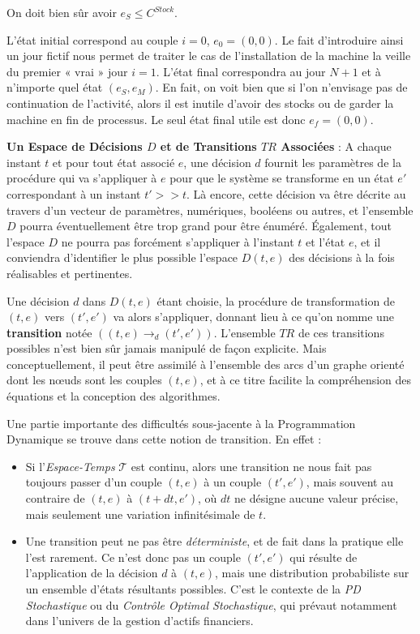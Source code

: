 On doit bien sûr avoir $e_S \leq C^{Stock}$.

L'état initial correspond au couple $i = 0$, $e_0 = (0, 0)$. Le fait d'introduire ainsi un jour fictif nous permet de traiter le cas de l'installation de la machine la veille du premier « vrai » jour $i = 1$.
L'état final correspondra au jour $N+1$ et à n'importe quel état $(e_S, e_M)$. En fait, on voit bien que si l'on n'envisage pas de continuation de l'activité, alors il est inutile d'avoir des stocks ou de garder la machine en fin de processus. Le seul état final utile est donc $e_f = (0, 0)$.

\textbf{Un Espace de Décisions $D$ et de Transitions $TR$ Associées} : A chaque instant $t$ et pour tout état associé $e$, une décision $d$ fournit les paramètres de la procédure qui va s'appliquer à $e$ pour que le système se transforme en un état $e'$ correspondant à un instant  $t' >> t$.  Là encore, cette décision va être décrite au travers d'un vecteur de paramètres, numériques, booléens ou autres, et l'ensemble $D$ pourra éventuellement être trop grand pour être énuméré. Également, tout l'espace $D $ ne pourra pas forcément s'appliquer à l'instant $t$ et l'état $e$, et il conviendra d'identifier le plus possible l'espace $D(t, e)$ des décisions à la fois réalisables et pertinentes. 

Une décision $d$ dans $D(t, e)$ étant choisie, la procédure de transformation de $(t, e)$ vers $(t', e')$ va alors s'appliquer, donnant lieu à ce qu'on nomme une \textbf{transition} notée $((t, e) \rightarrow_d (t', e'))$. L'ensemble $TR$ de ces transitions possibles n'est bien sûr jamais manipulé de façon explicite. Mais conceptuellement, il peut être assimilé à l'ensemble des arcs d'un graphe orienté dont les nœuds sont les couples $(t, e)$, et à ce titre facilite la compréhension des équations et la conception des algorithmes. 

Une partie importante des difficultés sous-jacente à la Programmation Dynamique se trouve dans cette notion de transition. En effet :
\begin{itemize}[label=$\square$]
	\item	Si l'\textit{Espace-Temps} $\mathcal{T}$ est continu, alors une transition ne nous fait pas toujours passer d'un couple $(t, e)$ à un couple $(t', e')$, mais souvent au contraire de $(t, e)$ à $(t+dt, e')$, où $dt$ ne désigne aucune valeur précise, mais seulement une variation infinitésimale de $t$.
	\item	Une transition peut ne pas être \textit{déterministe}, et de fait dans la pratique elle l'est rarement. Ce n'est donc pas un couple $(t', e')$ qui résulte de l'application de la décision $d$ à $(t, e)$, mais une distribution probabiliste sur un ensemble d'états résultants possibles. C'est le contexte de la \textit{PD Stochastique} ou du \textit{Contrôle Optimal Stochastique}, qui prévaut notamment dans l'univers de la gestion d'actifs financiers. 
\end{itemize}

